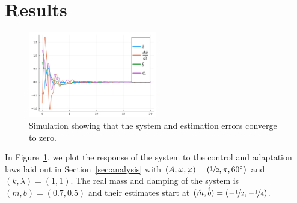 \section{Results}
\label{sec:results}

\begin{figure}
  \centering
  \includegraphics[width=0.5\textwidth]{./figures/adaptationrule2.pdf}
  \caption{Simulation showing that the system and estimation errors converge to
  zero.}
  \label{fig:adaptation}
\end{figure}

In Figure~\ref{fig:adaptation}, we plot the response of the system to the
control and adaptation laws laid out in Section~\ref{sec:analysis} with $(A,
\omega, \varphi) = (\nicefrac{1}{2}, \pi, 60^\circ)$ and $(k, \lambda) = (1,
1)$. The real mass and damping of the system is $(m, b) = (0.7, 0.5)$ and their
estimates start at $(\hat{m}, \hat{b}) = (-\nicefrac{1}{2}, -\nicefrac{1}{4})$.
